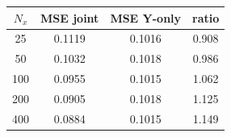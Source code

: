 {\scriptsize\setlength{\tabcolsep}{4pt}
\begin{tabular}{c c c c}
\toprule
$N_x$ & MSE joint & MSE Y-only & ratio \\
\midrule
25 & 0.1119 & 0.1016 & 0.908 \\
50 & 0.1032 & 0.1018 & 0.986 \\
100 & 0.0955 & 0.1015 & 1.062 \\
200 & 0.0905 & 0.1018 & 1.125 \\
400 & 0.0884 & 0.1015 & 1.149 \\
\bottomrule
\end{tabular}}

